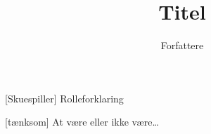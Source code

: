 \documentclass[a4paper,11pt]{article}
\title{Titel}
\author{Forfattere}
\begin{document}
\maketitle

\begin{roles}
[Skuespiller] Rolleforklaring
\end{roles}

\begin{sketch}

[tænksom] At være eller ikke være\ldots {}

\end{sketch}
\end{document}

